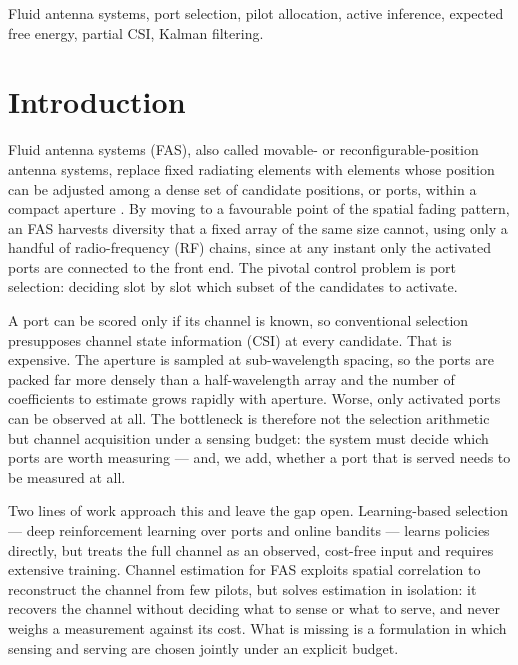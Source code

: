 \documentclass[journal]{IEEEtran}
\begin{document}
\begin{IEEEkeywords}
Fluid antenna systems, port selection, pilot allocation, active inference,
expected free energy, partial CSI, Kalman filtering.
\end{IEEEkeywords}

\section{Introduction}
\label{sec:intro}

Fluid antenna systems (FAS), also called movable- or reconfigurable-position
antenna systems, replace fixed radiating elements with elements whose position
can be adjusted among a dense set of candidate positions, or ports, within a
compact aperture \cite{wong2021fas}. By moving to a favourable point of the
spatial fading pattern, an FAS harvests diversity that a fixed array of the
same size cannot, using only a handful of radio-frequency (RF) chains, since at
any instant only the activated ports are connected to the front end. The
pivotal control problem is port selection: deciding slot by slot which subset
of the candidates to activate.

A port can be scored only if its channel is known, so conventional selection
presupposes channel state information (CSI) at every candidate. That is
expensive. The aperture is sampled at sub-wavelength spacing, so the ports are
packed far more densely than a half-wavelength array and the number of
coefficients to estimate grows rapidly with aperture. Worse, only activated
ports can be observed at all. The bottleneck is therefore not the selection
arithmetic but channel acquisition under a sensing budget: the system must
decide which ports are worth measuring --- and, we add, whether a port that is
served needs to be measured at all.

Two lines of work approach this and leave the gap open. Learning-based
selection --- deep reinforcement learning over ports \cite{drl_switching} and
online bandits \cite{online_portsel} --- learns policies directly, but treats
the full channel as an observed, cost-free input and requires extensive
training. Channel estimation for FAS \cite{sbar,fas_lmmse} exploits spatial
correlation to reconstruct the channel from few pilots, but solves estimation
in isolation: it recovers the channel without deciding what to sense or what to
serve, and never weighs a measurement against its cost. What is missing is a
formulation in which sensing and serving are chosen jointly under an explicit
budget.
\end{document}
